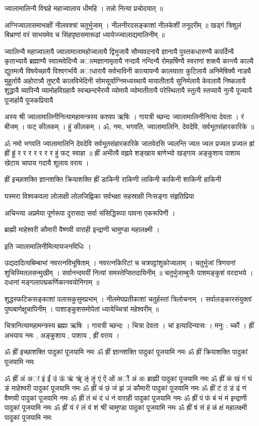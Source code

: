 ज्वालामालिन्यै विद्महे महाज्वालाय धीमहि । तन्नो नित्या प्रचोदयात् ॥

अग्निज्वालासमाभाक्षीं नीलवक्त्रां चतुर्भुजाम् । नीलनीरदसङ्काशां नीलकेशीं तनूदरीम् ॥
खड्गं त्रिशूलं बिभ्राणां वरं साभयमेव च सिंहपृष्ठसमारूढां ध्यायेज्ज्वालाद्यमालिनीम् ॥

ज्वालिन्यै महाज्वालायै ज्वालामालामहोज्वलायै द्विभुजायै सौम्यवदनायै ज्ञानायै पुस्तकधारुण्यै कपर्दिन्यै कृताभ्यायै ब्रह्माण्यै स्वात्मवेदिन्यै अात्मज्ञानामृतायै नन्दायै नन्दिन्यै रोमहर्षिण्यै स्वराणां शक्त्यै कान्त्यै काल्यै द्युतमत्यै विषयेच्छायै विश्वगर्भायै अाधारायै सर्वभाविनी कात्यायन्यै कालयाता कुटिलायै  अनिमेषिक्यै नाड्यै मुहूर्तायै अहोरात्र्यै तुष्ट्यै कालविभेदिनी सोमसूर्याग्निमध्यस्थायै मायातीतायै सुनिर्मलायै केवलायै निष्कलायै शुद्धायै व्यापिन्यै व्यामोहविग्रहायै स्वच्छन्दभैरव्यै व्योमायै व्योमातीतायै परेस्थितायै स्तुत्यै स्तव्यायै नुत्यै पूज्यायै पूजार्हायै पूजकप्रियायै 

अस्य श्री ज्वालामालिनीनित्यामहामन्त्रस्य कश्यप ऋषिः । गायत्री च्छन्दः ज्वालामालिनीनित्या देवता । रं बीजम् । फट् कीलकम् । हुं कीलकम् ।
ॐ, नमः, भगवति, ज्वालामालिनि, देवदेवि, सर्वभूतसंहारकारिके ॥
 
 ॐ नमो भगवति ज्वालामालिनि देवदेवि सर्वभूतसंहारकारिके जातवेदसि ज्वलन्ति ज्वल ज्वल प्रज्वल प्रज्वल ह्रां ह्रीं ह्रूं र र  र र  र र र हुं फट् स्वाहा ॥
 ह्रीं अभीत्यै वह्नये शङ्खाय बाणेभ्यो खड्गाय अङ्कुशाय पाशाय खेटाय चापाय गदायै शूलाय वराय ।
 
 ह्रीं इच्छाशक्ति ज्ञानशक्ति क्रियाशक्ति 
 ह्रीं डाकिनी राकिणी लाकिनी काकिनी शाकिनी हाकिनी 
 
 घस्मरा विश्वकवला लोलाक्षी लोलजिह्विका सर्वभक्षा सहस्राक्षी निःसङ्गा संहृतिप्रिया 
 
अचिन्त्या अप्रमेया पूर्णरूपा दुरासदा सर्वा संसिद्धिरूपा पावना एकरूपिणी ।

ब्राह्मी माहेश्वरी कौमारी वैष्णवी वाराही  इन्द्राणी चामुण्डा महालक्ष्मी ।

इति ज्वालामालिनीमित्यायजनविधिः ।

उद्यदादित्यबिम्बाभां नवरत्नविभूषिताम् । नवरत्नकिरिटां च चत्रपट्टांशुकोज्वलाम् ।
चतुर्भुजां त्रिणयनां शुचिस्मितलसन्मुखीम् । सर्वानन्दमयीं नित्यां समस्तेप्सितदायिनीम् ॥
चतुर्भुजाम्बुजैः पाशमङ्कुशं वरदाभये । दधानां मङ्गलापद्मकर्णिकानवयोनिगाम् ॥

शुद्धस्फटिकसङ्काशां पलासकुसुमप्रभाम् । नीलमेघप्रतीकाशां चतुर्हस्तां त्रिलोचनाम् । 
सर्वालङ्कारसंयुक्तां पुष्पबाणेक्षुचापिनीम् । पाशाङ्कुशसमोपेतां ध्यायेच्चित्रां महेश्वरीम् ॥

चित्रानित्यामहामन्त्रस्य ब्रह्मा ऋषिः । गायत्री च्छन्दः । चित्रा देवता ।
चां इत्यादिन्यासः ।
मनुः : च्कौं ।
ह्रीं अभयाय नमः , अङ्कुशाय , पाशाय , ह्रीं वराय । 

ॐ ह्रीं इच्छाशक्ति पादुकां पूजयामि नमः
ॐ ह्रीं  ज्ञानशक्ति पादुकां पूजयामि नमः
ॐ ह्रीं  क्रियाशक्ति पादुकां पूजयामि नमः

ॐ ह्रीं अं अां इं ईं उं ऊं ऋं ॠं ऌं ऌृं एं ऐं ओं अौं अं अः ब्राह्मी पादुकां पूजयामि नमः
ॐ ह्रीं कं खं गं घं ङं माहेश्वरी पादुकां पूजयामि नमः
ॐ ह्रीं चं छं जं झं ञं कौमारी पादुकां पूजयामि नमः
ॐ ह्रीं टं ठं डं ढं णं वैष्णवी पादुकां पूजयामि नमः
ॐ ह्रीं तं थं दं धं नं वाराही पादुकां पूजयामि नमः
ॐ ह्रीं पं फं बं भं मं इन्द्राणी पादुकां पूजयामि नमः
ॐ ह्रीं यं रं लं वं शं श्रीं चामुण्डा पादुकां पूजयामि नमः
ॐ ह्रीं षं सं हं ळं क्षं महालक्ष्मी पादुकां पूजयामि नमः

